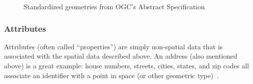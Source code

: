 \begin{figure}
    \centering

      \hfill
{}
       \hfill
      \hfill
    \caption{Standardized geometries from OGC's Abstract Specification}
    \label{fig:geoms}
    
\end{figure}

\subsubsection{Attributes}
Attributes (often called ``properties'') are simply non-spatial data that is associated with the spatial data described above. An address (also mentioned above) is a great example: house numbers, streets, cities, states, and zip codes all associate an identifier with a point in space (or other geometric type)~\cite{gentle_intro}.


